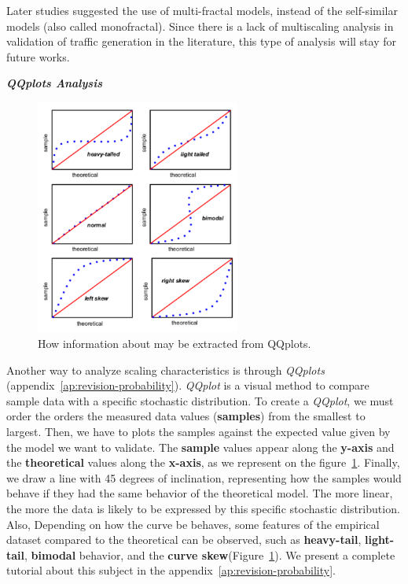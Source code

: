 Later studies suggested the use of multi-fractal models, instead of the self-similar models (also called monofractal)\cite{validate-trafficgen}\cite{udp-flows-model}. Since there is a lack of multiscaling analysis in validation of traffic generation in the literature, this type of analysis will stay for future works.

\smallskip \noindent \textbf{\textit{QQplots Analysis}}

\begin{figure}[ht!]
    \centering
    \includegraphics[width=0.6\textwidth]{figures/ch2/qqplot-tutorial}
    \caption{ How information about may be extracted from QQplots.}
    \label{fig:qqplot-tutorial}
\end{figure}


Another way to analyze scaling characteristics is through \textit{QQplots} (appendix~\ref{ap:revision-probability})\cite{paper-qqplot}\cite{web-qq-tuto1}\cite{web-qq-tuto2}. \textit{\acrshort{QQplot}} is a visual method to compare sample data with a specific stochastic distribution.  To create a \textit{QQplot}, we must order the orders the measured data values (\textbf{samples}) from the smallest to largest. Then, we have to plots the samples against the expected value given by the model we want to validate. The \textbf{sample} values appear along the \textbf{y-axis} and the \textbf{theoretical} values along the \textbf{x-axis}, as we represent on the figure~\ref{fig:qqplot-tutorial}. Finally, we draw a line with 45 degrees of inclination, representing how the samples would behave if they had the same behavior of the theoretical model. The more linear, the more the data is likely to be expressed by this specific stochastic distribution. Also, Depending on how the curve be behaves, some features of the empirical dataset compared to the theoretical can be observed, such as \textbf{heavy-tail}, \textbf{light-tail}, \textbf{bimodal} behavior, and the \textbf{curve skew}(Figure~\ref{fig:qqplot-tutorial}). We present a complete tutorial about this subject in the appendix~\ref{ap:revision-probability}.

